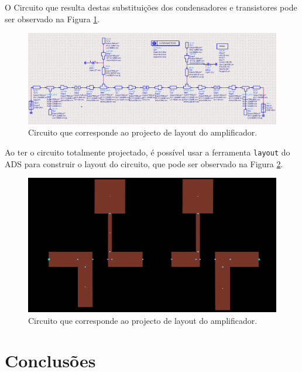 \documentclass[11pt]{article}
\numberwithin{equation}{section}
\begin{document}
O Circuito que resulta destas substituições dos condensadores e transistores pode ser observado na Figura \ref{fig:Circuito_layout}.

\begin{figure}[H]
	\centering
	\includegraphics[keepaspectratio=true, scale=0.45]{exps/Circuito_layout}
	\vspace{-0.5em}
	\caption{Circuito que corresponde ao projecto de layout do amplificador.}
	\vspace{-0.8em}
	\label{fig:Circuito_layout}
\end{figure}

Ao ter o circuito totalmente projectado, é possível usar a ferramenta \texttt{layout} do ADS para construir o layout do circuito, que pode ser observado na Figura \ref{fig:layout}.

\begin{figure}[H]
	\centering
	\includegraphics[keepaspectratio=true, scale=0.45]{exps/layout}
	\vspace{-0.5em}
	\caption{Circuito que corresponde ao projecto de layout do amplificador.}
	\vspace{-0.8em}
	\label{fig:layout}
\end{figure}

\section{Conclusões}
\end{document}
